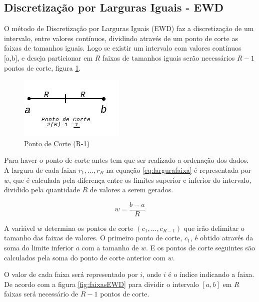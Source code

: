 


\subsection{Discretização por Larguras Iguais - EWD}\label{cap:refTeor:subsec:ewd}

O método de Discretização por Larguras Iguais (EWD) faz a discretização de um intervalo, entre valores contínuos, dividindo através de um ponto de corte as faixas de tamanhos iguais. Logo se existir um intervalo com valores contínuos [a,b], e deseja particionar em ${R}$ faixas de tamanhos iguais serão necessários ${R-1}$ pontos de corte, figura \ref{fig:pontocorte}. 

\begin{figure}[h]
        \centering
        \includegraphics[scale=1]{figs/faixaA-B_PontoCorte.png}
        \caption{Ponto de Corte (R-1)} \label{fig:pontocorte}
\end{figure}

Para haver o ponto de corte antes tem que ser realizado a ordenação dos dados. A largura de cada faixa ${r_1,...,r_R}$ na equação \ref{eq:largurafaixa} é representada por ${w}$, que é calculada pela diferença entre os limites superior e inferior do intervalo, dividido pela quantidade ${R}$ de valores a serem gerados.

\begin{equation}
 w = \frac{b-a}{R}
 \label{eq:largurafaixa}
\end{equation}

A variável ${w}$ determina os pontos de corte ${(c_1,...,c_{R-1})}$ que irão delimitar o tamanho das faixas de valores. O primeiro ponto de corte, ${c_1}$, é obtido através da soma do limite inferior ${a}$ com a tamanho de ${w}$. E os pontos de corte seguintes são calculados pela soma do ponto de corte anterior com ${w}$.


O valor de cada faixa será representado por ${i}$, onde ${i}$ é o índice indicando a faixa. De acordo com a figura \ref{fig:faixasEWD} para dividir o intervalo ${[a,b]}$ em ${R}$ faixas será necessário de ${R-1}$ pontos de corte.

